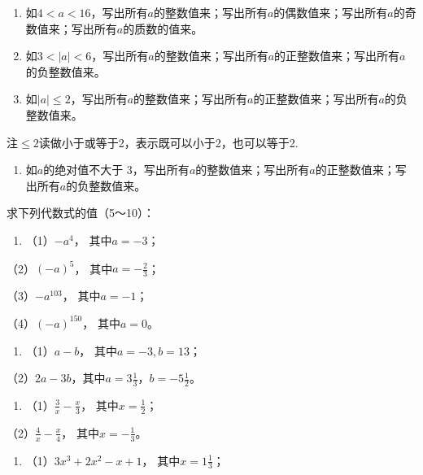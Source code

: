 \begin{enumerate}
\item
  如\(4 < a < 16\)，写出所有\(a\)的整数值来；写出所有\(a\)的偶数值来；写出所有\(a\)的奇数值来；写出所有\(a\)的质数的值来。
\item
  如\(3 < |a| < 6\)，写出所有\(a\)的整数值来；写出所有\(a\)的正整数值来；写出所有\(a\)的负整数值来。
\item
  如\(|a| \leqslant 2\)，写出所有\(a\)的整数值来；写出所有\(a\)的正整数值来；写出所有\(a\)的负整数值来。
\end{enumerate}

注\(\leqslant 2\)读做小于或等于2，表示既可以小于2，也可以等于2.

\begin{enumerate}[start=4]
\item
  如\(a\)的绝对值不大于
  3，写出所有\(a\)的整数值来；写出所有\(a\)的正整数值来；写出所有\(a\)的负整数值来。
\end{enumerate}

求下列代数式的值（5～10）：

\begin{enumerate}[start=5]
\item
  （1）\(-a^4\)， 其中\(a = -3\)；
\end{enumerate}

（2）\((-a)^{5}\)， 其中\(a = -\frac{2}{3}\)；

（3）\(-a^{103}\)， 其中\(a = -1\)；

（4）\((-a)^{150}\)， 其中\(a = 0\)。

\begin{enumerate}[start=6]
\item
  （1）\(a - b\)， 其中\(a = -3, b = 13\)；
\end{enumerate}

（2）\(2a - 3b\)，其中\(a = 3\frac{1}{3}\)，\(b = -5\frac{1}{2}\)。

\begin{enumerate}[start=7]
\item
  （1）\(\frac{3}{x} - \frac{x}{3}\)， 其中\(x = \frac{1}{2}\)；
\end{enumerate}

（2）\(\frac{4}{x} - \frac{x}{4}\)， 其中\(x = -\frac{1}{3}\)。

\begin{enumerate}[start=8]
\item
  （1）\(3x^{3} + 2x^{2} - x + 1\)， 其中\(x = 1\frac{1}{3}\)；
\end{enumerate}

